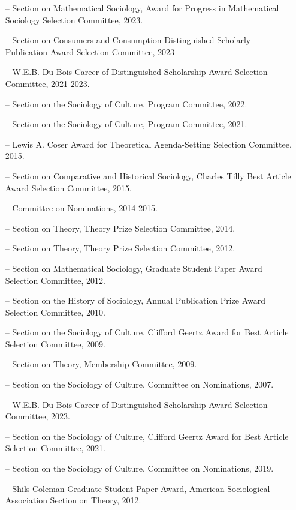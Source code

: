 \begin{itemize}[itemsep=-0.5ex] 
    \item[--] Section on Mathematical Sociology, Award for Progress in Mathematical Sociology Selection Committee, 2023.
    \item[--] Section on Consumers and Consumption Distinguished Scholarly Publication Award Selection Committee, 2023
    \item[--] W.E.B. Du Bois Career of Distinguished Scholarship Award Selection Committee, 2021-2023.
    \item[--] Section on the Sociology of Culture, Program Committee, 2022.
    \item[--] Section on the Sociology of Culture, Program Committee, 2021.
    \item[--] Lewis A. Coser Award for Theoretical Agenda-Setting Selection Committee, 2015.
    \item[--] Section on Comparative and Historical Sociology, Charles Tilly Best Article Award Selection Committee, 2015.
    \item[--] Committee on Nominations, 2014-2015. 
    \item[--] Section on Theory, Theory Prize Selection Committee, 2014.
    \item[--] Section on Theory, Theory Prize Selection Committee, 2012.
    \item[--] Section on Mathematical Sociology, Graduate Student Paper Award Selection Committee, 2012.
    \item[--] Section on the History of Sociology, Annual Publication Prize Award Selection Committee, 2010.
    \item[--] Section on the Sociology of Culture, Clifford Geertz Award for Best Article Selection Committee, 2009.
    \item[--] Section on Theory, Membership Committee, 2009.
    \item[--] Section on the Sociology of Culture, Committee on Nominations, 2007.
\end{itemize}

\begin{itemize}[itemsep=-0.5ex]
    \item[--] W.E.B. Du Bois Career of Distinguished Scholarship Award Selection Committee, 2023.
    \item[--] Section on the Sociology of Culture, Clifford Geertz Award for Best Article Selection Committee, 2021.
    \item[--] Section on the Sociology of Culture, Committee on Nominations, 2019.
    \item[--] Shils-Coleman Graduate Student Paper Award, American Sociological Association Section on Theory, 2012.
\end{itemize}

